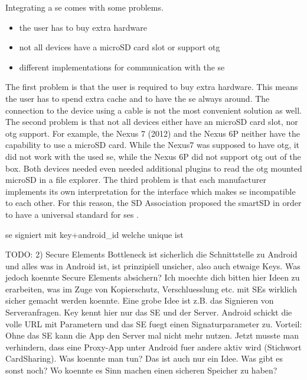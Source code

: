 Integrating a \gls{se} comes with some problems.
\begin{itemize}
  \item the user has to buy extra hardware
  \item not all devices have a microSD card slot or support \gls{otg}
  \item different implementations for communication with the \gls{se}
\end{itemize}
The first problem is that the user is required to buy extra hardware.
This means the user has to spend extra cache and to have the \gls{se} always around.
The connection to the device using a cable is not the most convenient solution as well.
The second problem is that not all devices either have an microSD card slot, nor \gls{otg} support.
For example, the Nexus 7 (2012) and the Nexus 6P neither have the capability to use a microSD card.
While the Nexus7 was supposed to have \gls{otg}, it did not work with the used \gls{se}, while the Nexus 6P did not support \gls{otg} out of the box.
Both devices needed even needed additional plugins to read the \gls{otg} mounted microSD in a file explorer.
The third problem is that each manufacturer implements its own interpretation for the interface which makes \gls{se} incompatible to each other.
For this reason, the SD Association proposed the smartSD in order to have a universal standard for \gls{se}s \cite{smartSD}.
\newline


se signiert mit key+android\_id welche unique ist

TODO:
2) Secure Elements
Bottleneck ist sicherlich die Schnittstelle zu Android und alles was in Android ist, ist prinzipiell unsicher, also auch etwaige Keys. Was jedoch koennte Secure Elements absichern? Ich moechte dich bitten hier Ideen zu erarbeiten, was im Zuge von Kopierschutz,  Verschluesslung etc. mit SEs wirklich sicher gemacht werden koennte. Eine grobe Idee ist z.B. das Signieren von Serveranfragen. Key kennt hier nur das SE und der Server. Android schickt die volle URL mit Parametern und das SE fuegt einen Signaturparameter zu. Vorteil: Ohne das SE kann die App den Server mal nicht mehr nutzen. Jetzt musste man verhindern, dass eine Proxy-App unter Android fuer andere aktiv wird (Stichwort CardSharing). Was koennte man tun? Das ist auch nur ein Idee. Was gibt es sonst noch? Wo koennte es Sinn machen einen sicheren Speicher zu haben?
